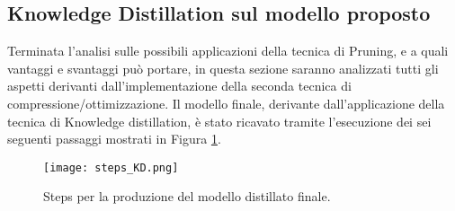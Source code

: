\subsection{Knowledge Distillation sul modello proposto}\label{KD_steps}
Terminata l'analisi sulle possibili applicazioni della tecnica di Pruning, e a quali vantaggi e svantaggi può portare, in questa sezione saranno analizzati tutti gli aspetti derivanti dall'implementazione della seconda tecnica di compressione/ottimizzazione. Il modello finale, derivante dall'applicazione della tecnica di Knowledge distillation, è stato ricavato tramite l'esecuzione dei sei seguenti passaggi mostrati in Figura \ref{steps_KD}.
\begin{figure}
    \centering
    \texttt{[image: steps\_KD.png]}
    \centering
    \caption{Steps per la produzione del modello distillato finale.}
    \label{steps_KD}
\end{figure}

